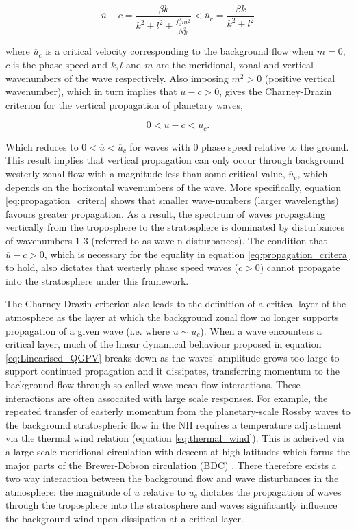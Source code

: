 \begin{equation} \label{eq:propagation_critera}
\overline{u} - c = \frac{\beta k}{k^2 + l^2 + \frac{f_0^2 m^2}{N_B^2}} < \overline{u}_c = \frac{\beta k}{k^2 + l^2}
\end{equation}

\noindent where $\overline{u}_c$ is a critical velocity corresponding to the background flow when $m = 0$, $c$ is the phase speed and $k, l$ and $m$ are the meridional, zonal and vertical wavenumbers of the wave respectively. Also imposing $m^2 > 0$ (positive vertical wavenumber), which in turn implies that $\overline{u} - c > 0$, gives the Charney-Drazin criterion for the vertical propagation of planetary waves,

\begin{equation} \label{eq:Charney-Drazin}
0 < \overline{u} - c < \overline{u}_c.
\end{equation}

Which reduces to $0 < \overline{u} < \overline{u}_c$ for waves with 0 phase speed relative to the ground. This result implies that vertical propagation can only occur through background westerly zonal flow with a magnitude less than some critical value, $\overline{u}_c$, which depends on the horizontal wavenumbers of the wave. More specifically, equation \ref{eq:propagation_critera} shows that smaller wave-numbers (larger wavelengths) favours greater propagation. As a result, the spectrum of waves propagating vertically from the troposphere to the stratosphere is dominated by disturbances of wavenumbers 1-3 (referred to as wave-n disturbances). The condition that $\overline{u} - c > 0$, which is necessary for the equality in equation \ref{eq:propagation_critera} to hold, also dictates that westerly phase speed waves ($c > 0$) cannot propagate into the stratosphere under this framework. 

The Charney-Drazin criterion also leads to the definition of a critical layer of the atmosphere as the layer at which the background zonal flow no longer supports propagation of a given wave (i.e. where $\overline{u} \sim \overline{u}_c$). When a wave encounters a critical layer, much of the linear dynamical behaviour proposed in equation \ref{eq:Linearised_QGPV} breaks down as the waves' amplitude grows too large to support continued propagation and it dissipates, transferring momentum to the background flow through so called wave-mean flow interactions. These interactions are often assocaited with large scale responses. For example, 
the repeated transfer of easterly momentum from the planetary-scale Rossby waves to the background stratospheric flow in the NH requires a temperature adjustment via the thermal wind relation (equation \ref{eq:thermal_wind}). This is acheived via a large-scale meridional circulation with descent at high latitudes which forms the major parts of the Brewer-Dobson circulation (BDC) \citep{butchartBrewerDobson2014}. There therefore exists a two way interaction between the background flow and wave disturbances in the atmosphere: the magnitude of $\overline{u}$ relative to $\overline{u}_c$ dictates the propagation of waves through the troposphere into the stratosphere and waves significantly influence the background wind upon dissipation at a critical layer.

